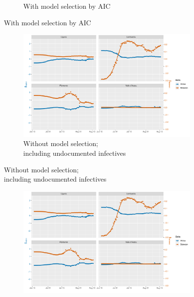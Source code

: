 \documentclass[12pt]{article}
\begin{document}
\begin{appendices}
\begin{figure}[H]
\begin{subfigure}{\textwidth}
    	      \caption{With model selection by AIC}
    	      \label{fig:beta_between_over_time_nordovest_aic}
    	    \end{subfigure}
    	\end{figure}
        \begin{figure}[H]\ContinuedFloat
    	    \begin{subfigure}{\textwidth}
    	      \centering
    	      \includegraphics[width=\linewidth]{output/model_between_lag14_betas_Nord-Ovest_UndocQuadratic_rolling.pdf}
    	      \caption{Without model selection; \\ including undocumented infectives}
    	      \label{fig:beta_between_over_time_nordovest_regular_undoc}
    	    \end{subfigure}
        \end{figure}
        \begin{figure}[H]\ContinuedFloat
    	    \begin{subfigure}{\textwidth}
    	      \centering
    	      \includegraphics[width=\linewidth]{output/model_between_lag14_betas_Nord-Ovest_aic_UndocQuadratic_rolling.pdf}

\end{subfigure}
\end{figure}
\end{appendices}
\end{document}
